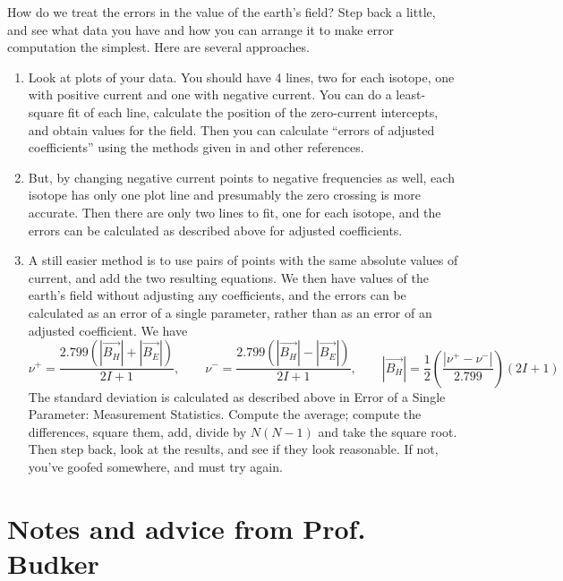 \documentclass{../lab}
\begin{document}
How do we treat the errors in the value of the earth's field? Step back a little, and see what data you have and how you can arrange it to make error computation the simplest. Here are several approaches.
\begin{enumerate}
    \item Look at plots of your data. You should have 4 lines, two for each isotope, one with positive current and one with negative current. You can do a least-square fit of each line, calculate the position of the zero-current intercepts, and obtain values for the field. Then you can calculate ``errors of adjusted coefficients'' using the methods given in \citeauthor{lyons} and other references.

    \item But, by changing negative current points to negative frequencies as well, each isotope has only one plot line and presumably the zero crossing is more accurate. Then there are only two lines to fit, one for each isotope, and the errors can be calculated as described above for adjusted coefficients.

    \item A still easier method is to use pairs of points with the same absolute values of current, and add the two resulting equations. We then have values of the earth's field without adjusting any coefficients, and the errors can be calculated as an error of a single parameter, rather than as an error of an adjusted coefficient. We have
    \[
    \nu^+ = \frac{2.799 (|\overrightarrow{B_H}|
        + |\overrightarrow{B_E}|)}{2I + 1}, \qquad
    \nu^- = \frac{2.799 (|\overrightarrow{B_H}|
        - |\overrightarrow{B_E}|)}{2I + 1}, \qquad
    |\overrightarrow{B_H}| =
        \frac{1}{2}\left(\frac{|\nu^+ - \nu^-|}{2.799}\right)(2I + 1)
    \]
    The standard deviation is calculated as described above in Error of a Single Parameter: Measurement Statistics. Compute the average; compute the differences, square them, add, divide by $N(N - 1)$ and take the square root. Then step back, look at the results, and see if they look reasonable. If not, you've goofed somewhere, and must try again.
\end{enumerate}

\section{Notes and advice from Prof. Budker}
\end{document}
